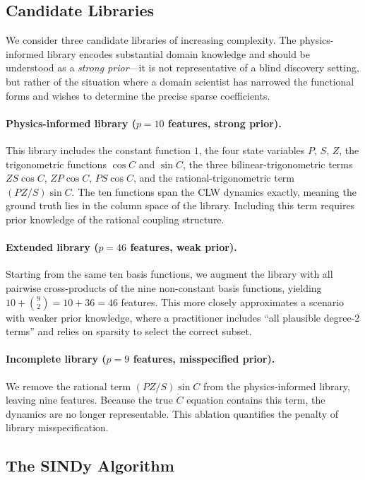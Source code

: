 \documentclass[12pt]{article}
\begin{document}
\subsection{Candidate Libraries}
\label{sec:libraries}

We consider three candidate libraries of increasing complexity.
The physics-informed library encodes substantial domain knowledge and should be understood as a \emph{strong prior}---it is not representative of a blind discovery setting, but rather of the situation where a domain scientist has narrowed the functional forms and wishes to determine the precise sparse coefficients.

\paragraph{Physics-informed library ($p = 10$ features, strong prior).}
This library includes the constant function $1$, the four state variables $P$, $S$, $Z$, the trigonometric functions $\cos C$ and $\sin C$, the three bilinear-trigonometric terms $ZS\cos C$, $ZP\cos C$, $PS\cos C$, and the rational-trigonometric term $(PZ/S)\sin C$.
The ten functions span the CLW dynamics exactly, meaning the ground truth lies in the column space of the library.
Including this term requires prior knowledge of the rational coupling structure.

\paragraph{Extended library ($p = 46$ features, weak prior).}
Starting from the same ten basis functions, we augment the library with all pairwise cross-products of the nine non-constant basis functions, yielding $10 + \binom{9}{2} = 10 + 36 = 46$ features.
This more closely approximates a scenario with weaker prior knowledge, where a practitioner includes ``all plausible degree-2 terms'' and relies on sparsity to select the correct subset.

\paragraph{Incomplete library ($p = 9$ features, misspecified prior).}
We remove the rational term $(PZ/S)\sin C$ from the physics-informed library, leaving nine features.
Because the true $\dot{C}$ equation contains this term, the dynamics are no longer representable.
This ablation quantifies the penalty of library misspecification.

\subsection{The SINDy Algorithm}
\label{sec:sindy}
\end{document}
